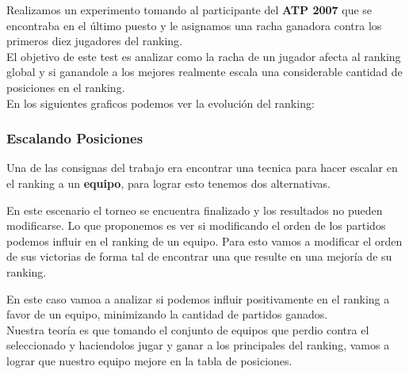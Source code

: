 Realizamos un experimento tomando al participante del \textbf{ATP 2007} que se encontraba en el último puesto y le asignamos una racha ganadora contra los primeros diez jugadores del ranking. \\

El objetivo de este test es analizar como la racha de un jugador afecta al ranking global y si ganandole a los mejores realmente escala una considerable cantidad de posiciones en el ranking. \\

En los siguientes graficos podemos ver la evolución del ranking: \\



\subsubsection{Escalando Posiciones}

Una de las consignas del trabajo era encontrar una tecnica para hacer escalar en el ranking a un \textbf{equipo}, para lograr esto tenemos dos alternativas. \\



En este escenario el torneo se encuentra finalizado y los resultados no pueden modificarse. Lo que proponemos es ver si modificando el orden de los partidos podemos influir en el ranking de un equipo. Para esto vamos a modificar el orden de sus victorias de forma tal de encontrar una que resulte en una mejoría de su ranking. \\



En este caso vamoa a analizar si podemos influir positivamente en el ranking a favor de un equipo, minimizando la cantidad de partidos ganados. \\

Nuestra teoría es que tomando el conjunto de equipos que perdio contra el seleccionado y haciendolos jugar y ganar a los principales del ranking, vamos a lograr que nuestro equipo mejore en la tabla de posiciones.
 




